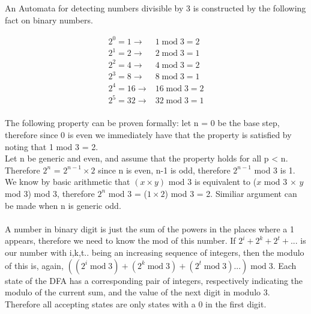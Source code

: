 \documentclass[12pt, a4paper, titlepage]{article}
\theoremstyle{break}
\begin{document}
    
An Automata for detecting numbers divisible by 3 is constructed by the following fact on binary numbers. 

\begin{align*}
    2^0=1\rightarrow& 1\;\text{mod}\;3 = 2  \\ 
    2^1=2\rightarrow& 2\;\text{mod}\;3 = 1  \\
    2^2=4\rightarrow& 4\;\text{mod}\;3 = 2  \\
    2^3=8\rightarrow& 8\;\text{mod}\;3 = 1  \\
    2^4=16\rightarrow& 16\;\text{mod}\;3 = 2  \\
    2^5=32\rightarrow& 32\;\text{mod}\;3 = 1  \\
\end{align*}

The following property can be proven formally: let n = 0 be the base step, therefore since 0 is even we immediately have that the property is satisfied by noting that 1 mod 3 = 2.\\
Let n be generic and even, and assume that the property holds for all p < n. Therefore $2^n$ = $2^{n-1}\times 2$ since n is even, n-1 is odd, therefore $2^{n-1}$ mod 3 is 1. We know by basic arithmetic that $(x \times y)$ mod $3$ is equivalent to ($x$ mod 3 $\times$ $y$ mod 3) mod 3, therefore $2^n$ mod 3 = ($1\times 2$) mod 3 = 2.
Similiar argument can be made when n is generic odd.\\
\\
A number in binary digit is just the sum of the powers in the places where a 1 appears, therefore we need to know the mod of this number.
If $2^i + 2^k + 2^t + ...$ is our number with i,k,t.. being an increasing sequence of integers, then the modulo of this is, again,
$((2^i \;\text{mod}\; 3) + (2^k \;\text{mod}\; 3) + (2^t \;\text{mod}\; 3)...) \;\text{mod}\;3$. Each state of the DFA has a corresponding pair of integers, respectively indicating the modulo of the current sum, and the value of the next digit in modulo 3. Therefore all accepting states are only states with a 0 in the first digit.
\end{document}
